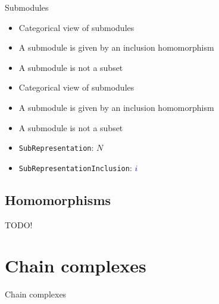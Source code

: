 \begin{frame}[fragile]{Submodules}{}
\begin{overprint}
\begin{itemize}
\item Categorical view of submodules
\item A submodule is given by an inclusion homomorphism
\item A submodule is not a subset
\end{itemize}
\begin{itemize}
\item Categorical view of submodules
\item A submodule is given by an inclusion homomorphism
\item A submodule is not a subset
\item \texttt{SubRepresentation}: \textcolor{BrickRed}{$N$}
\item \texttt{SubRepresentationInclusion}: \textcolor{blue}{$i$}
\end{itemize}
\end{overprint}
\end{frame}


\subsection{Homomorphisms}

\begin{frame}
TODO!
\end{frame}


\section{Chain complexes}

\begin{frame}{Chain complexes}
\end{frame}


